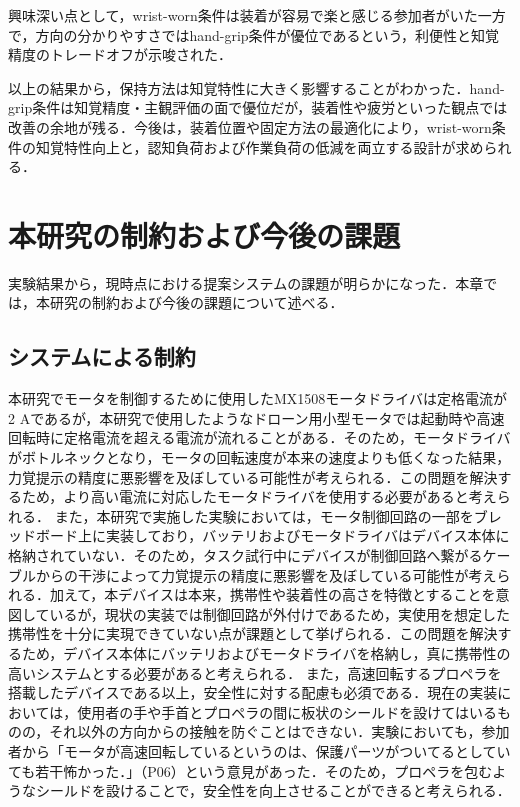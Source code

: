 \documentclass[a4paper,11pt]{jreport}
\begin{document}
興味深い点として，wrist-worn条件は装着が容易で楽と感じる参加者がいた一方で，方向の分かりやすさではhand-grip条件が優位であるという，利便性と知覚精度のトレードオフが示唆された．

以上の結果から，保持方法は知覚特性に大きく影響することがわかった．hand-grip条件は知覚精度・主観評価の面で優位だが，装着性や疲労といった観点では改善の余地が残る．今後は，装着位置や固定方法の最適化により，wrist-worn条件の知覚特性向上と，認知負荷および作業負荷の低減を両立する設計が求められる．

\chapter{本研究の制約および今後の課題}
実験結果から，現時点における提案システムの課題が明らかになった．本章では，本研究の制約および今後の課題について述べる．

\section{システムによる制約}
本研究でモータを制御するために使用したMX1508モータドライバは定格電流が2 Aであるが，本研究で使用したようなドローン用小型モータでは起動時や高速回転時に定格電流を超える電流が流れることがある．そのため，モータドライバがボトルネックとなり，モータの回転速度が本来の速度よりも低くなった結果，力覚提示の精度に悪影響を及ぼしている可能性が考えられる．この問題を解決するため，より高い電流に対応したモータドライバを使用する必要があると考えられる．
また，本研究で実施した実験においては，モータ制御回路の一部をブレッドボード上に実装しており，バッテリおよびモータドライバはデバイス本体に格納されていない．そのため，タスク試行中にデバイスが制御回路へ繋がるケーブルからの干渉によって力覚提示の精度に悪影響を及ぼしている可能性が考えられる．加えて，本デバイスは本来，携帯性や装着性の高さを特徴とすることを意図しているが，現状の実装では制御回路が外付けであるため，実使用を想定した携帯性を十分に実現できていない点が課題として挙げられる．この問題を解決するため，デバイス本体にバッテリおよびモータドライバを格納し，真に携帯性の高いシステムとする必要があると考えられる．
また，高速回転するプロペラを搭載したデバイスである以上，安全性に対する配慮も必須である．現在の実装においては，使用者の手や手首とプロペラの間に板状のシールドを設けてはいるものの，それ以外の方向からの接触を防ぐことはできない．実験においても，参加者から「モータが高速回転しているというのは、保護パーツがついてるとしていても若干怖かった．」（P06）という意見があった．そのため，プロペラを包むようなシールドを設けることで，安全性を向上させることができると考えられる．
\end{document}
